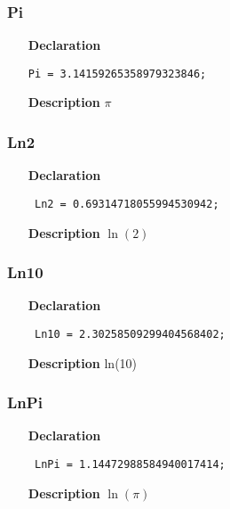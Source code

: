 \documentclass[12pt,a4paper,oneside]{report}
\newcommand{\declarationitem}[1]{\textbf{#1}}
\newcommand{\descriptiontitle}[1]{\textbf{#1}}
\newcommand{\code}[1]{\texttt{#1}}
\begin{document}
\subsubsection{Pi}
\label{utypes-Pi}	
\begin{itemize}\item[\declarationitem{Declaration}\hfill]
	\begin{flushleft}
		\code{Pi = 3.14159265358979323846;}
	\end{flushleft}
	\item[\descriptiontitle{Description}]
	$\pi$
\end{itemize}
\subsubsection{Ln2}
\label{utypes-Ln2}
\begin{itemize}\item[\declarationitem{Declaration}\hfill]
	\begin{flushleft}
		\code{
			Ln2        = 0.69314718055994530942;}
		
	\end{flushleft}
	\par
	\item[\descriptiontitle{Description}]
	$\ln(2)$
	
\end{itemize}
\subsubsection{Ln10}
\label{utypes-Ln10}
\begin{itemize}\item[\declarationitem{Declaration}\hfill]
	\begin{flushleft}
		\code{
			Ln10       = 2.30258509299404568402;}
		
	\end{flushleft}
	
	\par
	\item[\descriptiontitle{Description}]
	ln(10)
	
\end{itemize}
\subsubsection{LnPi}
\label{utypes-LnPi}
\begin{itemize}\item[\declarationitem{Declaration}\hfill]
	\begin{flushleft}
		\code{
			LnPi       = 1.14472988584940017414;}
		
	\end{flushleft}
	
	\par
	\item[\descriptiontitle{Description}]
	$\ln(\pi)$
	
\end{itemize}
\end{document}
